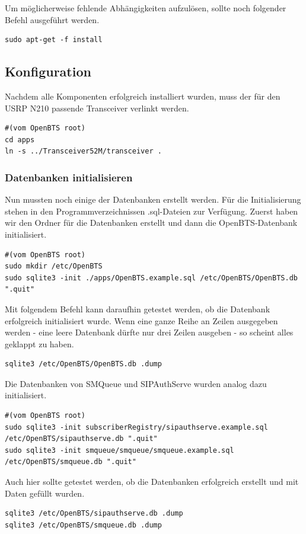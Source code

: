 Um möglicherweise fehlende Abhängigkeiten aufzulösen, sollte noch folgender Befehl ausgeführt werden.
\begin{lstlisting}
sudo apt-get -f install
\end{lstlisting}

\subsection{Konfiguration}
Nachdem alle Komponenten erfolgreich installiert wurden, muss der für den USRP N210 passende Transceiver verlinkt werden.
\begin{lstlisting}
#(vom OpenBTS root)
cd apps
ln -s ../Transceiver52M/transceiver .
\end{lstlisting}

\subsubsection{Datenbanken initialisieren}
Nun mussten noch einige der Datenbanken erstellt werden. Für die Initialisierung stehen in den Programmverzeichnissen .sql-Dateien zur Verfügung. Zuerst haben wir den Ordner für die Datenbanken erstellt und dann die OpenBTS-Datenbank initialisiert.
\begin{lstlisting}
#(vom OpenBTS root)
sudo mkdir /etc/OpenBTS
sudo sqlite3 -init ./apps/OpenBTS.example.sql /etc/OpenBTS/OpenBTS.db ".quit"
\end{lstlisting}

Mit folgendem Befehl kann daraufhin getestet werden, ob die Datenbank erfolgreich initialisiert wurde. Wenn eine ganze Reihe an Zeilen ausgegeben werden - eine leere Datenbank dürfte nur drei Zeilen ausgeben - so scheint alles geklappt zu haben.
\begin{lstlisting}
sqlite3 /etc/OpenBTS/OpenBTS.db .dump
\end{lstlisting}

Die Datenbanken von SMQueue und SIPAuthServe wurden analog dazu initialisiert.
\begin{lstlisting}
#(vom OpenBTS root)
sudo sqlite3 -init subscriberRegistry/sipauthserve.example.sql /etc/OpenBTS/sipauthserve.db ".quit"
sudo sqlite3 -init smqueue/smqueue/smqueue.example.sql /etc/OpenBTS/smqueue.db ".quit"
\end{lstlisting}

Auch hier sollte getestet werden, ob die Datenbanken erfolgreich erstellt und mit Daten gefüllt wurden.
\begin{lstlisting}
sqlite3 /etc/OpenBTS/sipauthserve.db .dump
sqlite3 /etc/OpenBTS/smqueue.db .dump
\end{lstlisting}

